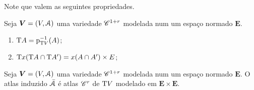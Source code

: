 Note que valem as seguintes propriedades.

\begin{exercise}
Seja $\bm V = (V, \mathcal{A})$ uma variedade $\mathscr{C}^{1+r}$ modelada num um espaço normado $\bm E$.
	\begin{enumerate}
	\item $\mathrm{T} A = \mathrm{p}_{\mathrm{T} V}^{-1}(A)$;
	\item $\mathrm{T} x(\mathrm{T} A \cap \mathrm{T} A') = x(A \cap A') \times E$;
	\end{enumerate}
\end{exercise}

\begin{proposition}
Seja $\bm V = (V, \mathcal{A})$ uma variedade $\mathscr{C}^{1+r}$ modelada num um espaço normado $\bm E$. O atlas induzido $\bar {\mathcal{A}}$ é atlas $\mathscr{C}^r$ de $\mathrm{T} V$ modelado em $\bm E \times \bm E$.
\end{proposition}
